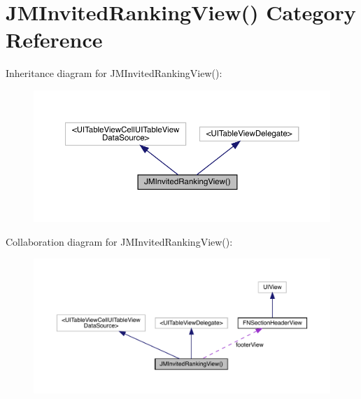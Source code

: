\hypertarget{category_j_m_invited_ranking_view_07_08}{}\section{J\+M\+Invited\+Ranking\+View() Category Reference}
\label{category_j_m_invited_ranking_view_07_08}


Inheritance diagram for J\+M\+Invited\+Ranking\+View()\+:\nopagebreak
\begin{figure}[H]
\begin{center}
\leavevmode
\includegraphics[width=350pt]{category_j_m_invited_ranking_view_07_08__inherit__graph}
\end{center}
\end{figure}


Collaboration diagram for J\+M\+Invited\+Ranking\+View()\+:\nopagebreak
\begin{figure}[H]
\begin{center}
\leavevmode
\includegraphics[width=350pt]{category_j_m_invited_ranking_view_07_08__coll__graph}
\end{center}
\end{figure}
